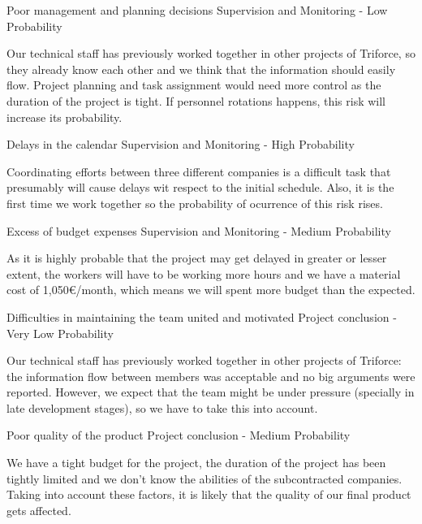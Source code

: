 \begin{risk}{Poor management and planning decisions}
\riskcat Supervision and Monitoring
 - Low Probability

Our technical staff has previously worked together in other projects of Triforce, so they already know each other and we think that the information should easily flow. Project planning and task assignment would need more control as the duration of the project is tight. If personnel rotations happens, this risk will increase its probability.
\end{risk}

\begin{risk}{Delays in the calendar}
\riskcat Supervision and Monitoring
 - High Probability

Coordinating efforts between three different companies is a difficult task that presumably will cause delays wit respect to the initial schedule. Also, it is the first time we work together so the probability of ocurrence of this risk rises.
\end{risk}

\begin{risk}{Excess of budget expenses}
\riskcat Supervision and Monitoring
 - Medium Probability

As it is highly probable that the project may get delayed in greater or lesser extent, the workers will have to be working more hours and we have a material cost of 1,050\euro/month, which means we will spent more budget than the expected.
\end{risk}

\begin{risk}{Difficulties in maintaining the team united and motivated}
\riskcat Project conclusion
 - Very Low Probability

Our technical staff has previously worked together in other projects of Triforce: the information flow between members was acceptable and no big arguments were reported. However, we expect that the team might be under pressure (specially in late development stages), so we have to take this into account.
\end{risk}

\begin{risk}{Poor quality of the product}
\riskcat Project conclusion
 - Medium Probability

We have a tight budget for the project, the duration of the project has been tightly limited and we don't know the abilities of the subcontracted companies. Taking into account these factors, it is likely that the quality of our final product gets affected.
\end{risk}

